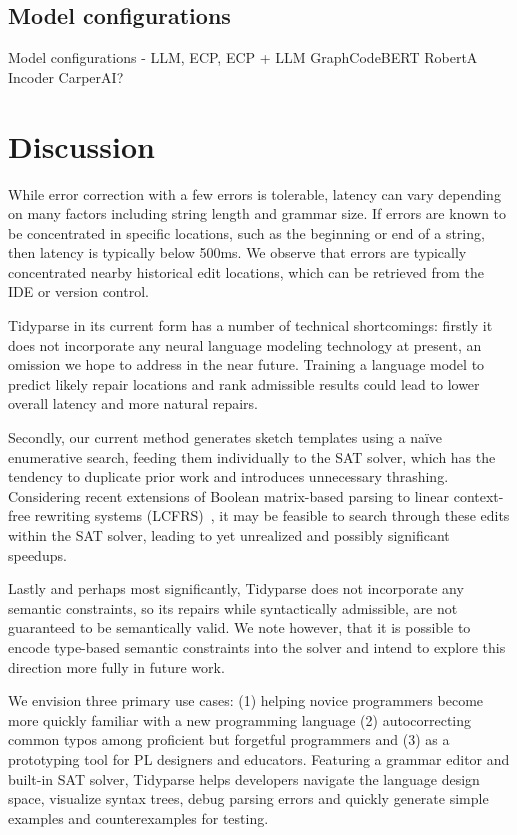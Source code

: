 \documentclass[sigplan,review,anonymous,acmsmall]{acmart}\settopmatter{printfolios=false,printccs=false,printacmref=false}
\begin{document}
\subsection{Model configurations}
Model configurations - LLM, ECP, ECP + LLM
GraphCodeBERT
RobertA
Incoder
CarperAI?

\section{Discussion}\label{sec:discussion}

While error correction with a few errors is tolerable, latency can vary depending on many factors including string length and grammar size. If errors are known to be concentrated in specific locations, such as the beginning or end of a string, then latency is typically below 500ms. We observe that errors are typically concentrated nearby historical edit locations, which can be retrieved from the IDE or version control.

Tidyparse in its current form has a number of technical shortcomings: firstly it does not incorporate any neural language modeling technology at present, an omission we hope to address in the near future. Training a language model to predict likely repair locations and rank admissible results could lead to lower overall latency and more natural repairs.

Secondly, our current method generates sketch templates using a na\"ive enumerative search, feeding them individually to the SAT solver, which has the tendency to duplicate prior work and introduces unnecessary thrashing. Considering recent extensions of Boolean matrix-based parsing to linear context-free rewriting systems (LCFRS)~\cite{cohen2016parsing}, it may be feasible to search through these edits within the SAT solver, leading to yet unrealized and possibly significant speedups.

Lastly and perhaps most significantly, Tidyparse does not incorporate any semantic constraints, so its repairs while syntactically admissible, are not guaranteed to be semantically valid. We note however, that it is possible to encode type-based semantic constraints into the solver and intend to explore this direction more fully in future work.

We envision three primary use cases: (1) helping novice programmers become more quickly familiar with a new programming language (2) autocorrecting common typos among proficient but forgetful programmers and (3) as a prototyping tool for PL designers and educators. Featuring a grammar editor and built-in SAT solver, Tidyparse helps developers navigate the language design space, visualize syntax trees, debug parsing errors and quickly generate simple examples and counterexamples for testing. %
\end{document}
